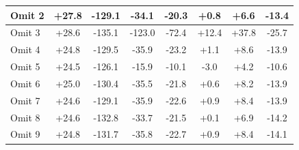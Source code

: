\begin{table}[!h]
\begin{center}
\begin{tabular}[h]{|l||c|c|c|c|c|c||c|}
Omit 2& +27.8& -129.1& -34.1& -20.3& +0.8& +6.6& -13.4\\\hline
{\color{Gray}Omit 3}&{\color{Gray} +28.6}&{\color{Gray} -135.1}&{\color{Gray} -123.0}&{\color{Gray} -72.4}&{\color{Gray} +12.4}&{\color{Gray} +37.8}&{\color{Gray} -25.7}\\\hline
Omit 4& +24.8& -129.5& -35.9& -23.2& +1.1& +8.6& -13.9\\\hline
Omit 5& +24.5& -126.1& -15.9& -10.1& -3.0& +4.2& -10.6\\\hline
Omit 6& +25.0& -130.4& -35.5& -21.8& +0.6& +8.2& -13.9\\\hline
Omit 7& +24.6& -129.1& -35.9& -22.6& +0.9& +8.4& -13.9\\\hline
Omit 8& +24.6& -132.8& -33.7& -21.5& +0.1& +6.9& -14.2\\\hline
Omit 9& +24.8& -131.7& -35.8& -22.7& +0.9& +8.4& -14.1\\\hline
\end{tabular}
\end{center}
\label{tab:run2_null_corrections_table}
\end{table}
\FloatBarrier
